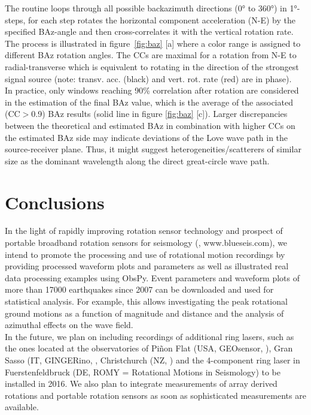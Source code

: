 \documentclass[12pt,reqno,letter]{article}
\begin{document}
The routine loops through all possible backazimuth directions (0° to 360°) in 1°- steps, for each step rotates the horizontal component acceleration (N-E) by the specified BAz-angle and then cross-correlates it with the vertical rotation rate. The process is illustrated in figure~\ref{fig:baz} [a] where a color range is assigned to different BAz rotation angles.  The CCs are maximal for a rotation from N-E to radial-transverse which is equivalent to rotating in the direction of the strongest signal source (note: transv. acc. (black) and vert. rot. rate (red) are in phase).\\ 
In practice, only windows reaching 90\% correlation after rotation are considered in the estimation of the final BAz value, which is the average of the associated (CC$>$0.9) BAz results (solid line in figure \ref{fig:baz} [c]). 
Larger discrepancies between the theoretical and estimated BAz in combination with higher CCs on the estimated BAz side may indicate deviations of the Love wave path in the source-receiver plane. Thus, it might suggest heterogeneities/scatterers of similar size as the dominant wavelength along the direct great-circle wave path.\\
%
%
\section*{Conclusions}
In the light of rapidly improving rotation sensor technology and prospect of portable broadband rotation sensors for seismology (\cite{Bernauer2016}, www.blueseis.com), we intend to promote the processing and use of rotational motion recordings by providing processed waveform plots and parameters as well as illustrated real data processing examples using ObsPy. Event parameters and waveform plots of more than 17000 earthquakes since 2007 can be downloaded and used for statistical analysis. For example, this allows investigating the peak rotational ground motions as a function of magnitude and distance and the analysis of azimuthal effects on the wave field.\\
In the future, we plan on including recordings of additional ring lasers, such as the ones located at the observatories of Pi\~{n}on Flat (USA, GEOsensor, \cite{Schreiber2003b}), Gran Sasso (IT, GINGERino, \cite{Ortolan2016}, Christchurch (NZ, \cite{Schreiber2003}) and the 4-component ring laser in Fuerstenfeldbruck (DE, ROMY = Rotational Motions in Seismology) to be installed in 2016. We also plan to integrate measurements of array derived rotations and portable rotation sensors as soon as sophisticated measurements are available.
\end{document}
